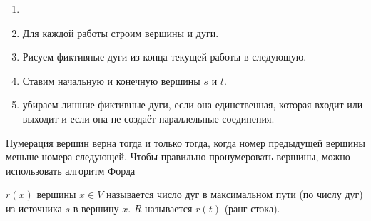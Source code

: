
\begin{enumerate}[nosep]
	\item[]
	
	\item Для каждой работы строим вершины и дуги.
	
	\item Рисуем фиктивные дуги из конца текущей работы в следующую.
	
	\item Ставим начальную и конечную вершины $s$ и $t$.
	
	\item убираем лишние фиктивные дуги, если она единственная, которая входит или выходит и если она не создаёт параллельные соединения.
\end{enumerate}

Нумерация вершин верна тогда и только тогда, когда номер предыдущей вершины меньше номера следующей. Чтобы правильно пронумеровать вершины, можно использовать алгоритм Форда


 $r(x)$ вершины $x \in V$ называется число дуг в максимальном пути (по числу дуг) из источника $s$ в вершину $x$.  $R$ называется $r(t)$ (ранг стока).

\algorithm[Форда]
